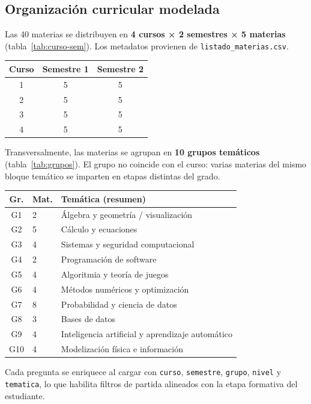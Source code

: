 \documentclass[11pt,a4paper]{article}
\newcommand{\iniciotabla}{\par\medskip\renewcommand{\arraystretch}{1.12}}
\newcommand{\fintabla}{\par\medskip}
\begin{document}
\subsection{Organización curricular modelada}

Las 40 materias se distribuyen en \textbf{4 cursos × 2 semestres × 5 materias} (tabla~\ref{tab:curso-sem}). Los metadatos provienen de \texttt{listado\_materias.csv}.

\iniciotabla
\begin{tabular}{@{}ccc@{}}
\toprule
\textbf{Curso} & \textbf{Semestre 1} & \textbf{Semestre 2} \\
\midrule
1 & 5 & 5 \\
2 & 5 & 5 \\
3 & 5 & 5 \\
4 & 5 & 5 \\
\bottomrule
\end{tabular}
\label{tab:curso-sem}
\fintabla

Transversalmente, las materias se agrupan en \textbf{10 grupos temáticos} (tabla~\ref{tab:grupos}). El grupo no coincide con el curso: varias materias del mismo bloque temático se imparten en etapas distintas del grado.

{\small\iniciotabla
\begin{tabular}{@{}clp{5.8cm}@{}}
\toprule
\textbf{Gr.} & \textbf{Mat.} & \textbf{Temática (resumen)} \\
\midrule
G1 & 2 & Álgebra y geometría / visualización \\
G2 & 5 & Cálculo y ecuaciones \\
G3 & 4 & Sistemas y seguridad computacional \\
G4 & 2 & Programación de software \\
G5 & 4 & Algoritmia y teoría de juegos \\
G6 & 4 & Métodos numéricos y optimización \\
G7 & 8 & Probabilidad y ciencia de datos \\
G8 & 3 & Bases de datos \\
G9 & 4 & Inteligencia artificial y aprendizaje automático \\
G10 & 4 & Modelización física e información \\
\bottomrule
\end{tabular}
\label{tab:grupos}
\fintabla}

Cada pregunta se enriquece al cargar con \texttt{curso}, \texttt{semestre}, \texttt{grupo}, \texttt{nivel} y \texttt{tematica}, lo que habilita filtros de partida alineados con la etapa formativa del estudiante.
\end{document}
